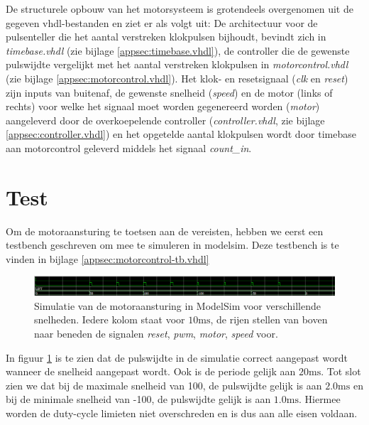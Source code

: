 \documentclass{report}
\begin{document}
De structurele opbouw van het motorsysteem is grotendeels overgenomen uit de gegeven vhdl-bestanden en ziet er als volgt uit:
De architectuur voor de pulsenteller die het aantal verstreken klokpulsen bijhoudt, bevindt zich in \textit{timebase.vhdl} (zie bijlage \ref{appsec:timebase.vhdl}), de controller die de gewenste pulswijdte vergelijkt met het aantal verstreken klokpulsen in \textit{motorcontrol.vhdl} (zie bijlage \ref{appsec:motorcontrol.vhdl}).
Het klok- en resetsignaal (\textit{clk} en \textit{reset}) zijn inputs van buitenaf, de gewenste snelheid (\textit{speed}) en de motor (links of rechts) voor welke het signaal moet worden gegenereerd worden (\textit{motor}) aangeleverd door de overkoepelende controller (\textit{controller.vhdl}, zie bijlage \ref{appsec:controller.vhdl}) en het opgetelde aantal klokpulsen wordt door timebase aan motorcontrol geleverd middels het signaal \textit{count\_in}.

\section{Test}
\label{sec:servo-test}

Om de motoraansturing te toetsen aan de vereisten, hebben we eerst een testbench geschreven om mee te simuleren in modelsim. Deze testbench is te vinden in bijlage \ref{appsec:motorcontrol-tb.vhdl} 

\begin{figure}[H]
	\includegraphics[width=\textwidth]{resource/motor-control-sim}
	\caption{Simulatie van de motoraansturing in ModelSim voor verschillende snelheden. Iedere kolom staat voor $10 \mathrm{ms}$, de rijen stellen van boven naar beneden de signalen \textit{reset}, \textit{pwm}, \textit{motor}, \textit{speed} voor.}
	\label{fig:motorcontrol-sim}
\end{figure}

In figuur \ref{fig:motorcontrol-sim} is te zien dat de pulswijdte in de simulatie correct aangepast wordt wanneer de snelheid aangepast wordt. Ook is de periode gelijk aan $20 \mathrm{ms}$. Tot slot zien we dat bij de maximale snelheid van 100, de pulswijdte gelijk is aan $2.0 \mathrm{ms}$ en bij de minimale snelheid van -100, de pulswijdte gelijk is aan $1.0 \mathrm{ms}$. Hiermee worden de duty-cycle limieten niet overschreden en is dus aan alle eisen voldaan.
\end{document}
